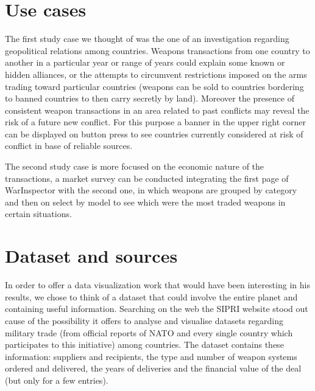 \documentclass{article}
\begin{document}
\begin{multicols}{2}
\section{Use cases}
The first study case we thought of was the one of an investigation regarding geopolitical relations among countries. Weapons transactions from one country to another in a particular year or range of years could explain some known or hidden alliances, or the attempts to circumvent restrictions imposed on the arms trading toward particular countries (weapons can be sold to countries bordering to banned countries to then carry secretly by land).  Moreover the presence of consistent weapon transactions in an area related to past conflicts may reveal the risk of a future new conflict. For this purpose a banner in the upper right corner can be displayed on button press to see countries currently considered at risk of conflict in base of reliable sources.

The second study case is more focused on the economic nature of the transactions, a market survey can be conducted integrating the first page of WarInspector with the second one, in which weapons are grouped by category and then on select by model to see which were the most traded weapons in certain situations. 



\section{Dataset and sources}
%


In order to offer a data visualization work that would have been interesting in his results, we chose to think of a dataset that could involve the entire planet and containing useful information. Searching on the web the SIPRI website stood out cause of the possibility it offers to analyse and visualise datasets regarding military trade (from official reports of NATO and every single country which participates to this initiative) among countries. The dataset contains these information: suppliers and recipients, the type and number of weapon systems ordered and delivered, the years of deliveries and the financial value of the deal (but only for a few entries). 


\end{multicols}
\end{document}
